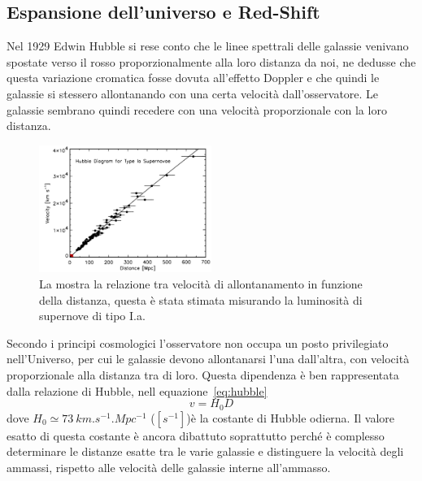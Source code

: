 \subsection{Espansione dell'universo e Red-Shift}\label{sec:espansione}

Nel 1929 Edwin Hubble si rese conto che le linee spettrali delle galassie venivano spostate verso il rosso proporzionalmente alla loro distanza da noi, ne dedusse che questa variazione cromatica fosse dovuta all'effetto Doppler e che quindi le galassie si stessero allontanando con una certa velocità dall'osservatore. Le galassie sembrano quindi recedere con una velocità proporzionale con la loro distanza.

\begin{figure}
    \centering
    \includegraphics[width=0.5\textwidth]{immagini/redshift.png}
    \caption{La mostra la relazione tra velocità di allontanamento in funzione della distanza, questa è stata stimata misurando la luminosità di supernove di tipo I.a.}\label{fig:redshift}
\end{figure}

Secondo i principi cosmologici l'osservatore non occupa un posto privilegiato nell'Universo, per cui le galassie devono allontanarsi l'una dall'altra, con velocità proporzionale alla distanza tra di loro. Questa dipendenza è ben rappresentata dalla relazione di Hubble, nell equazione~\ref{eq:hubble}
\begin{equation}\label{eq:hubble}
    v = H_0 D
\end{equation}
dove $H_0 \simeq \SI{73}{km.s^{-1}.Mpc^{-1}}$ ($[s^{-1}]$)è la costante di Hubble odierna. Il valore esatto di questa costante è ancora dibattuto soprattutto perché è complesso determinare le distanze esatte tra le varie galassie e distinguere la velocità degli ammassi, rispetto alle velocità delle galassie interne all'ammasso.

